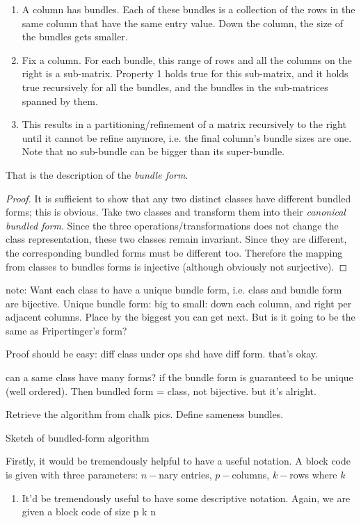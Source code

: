 \documentclass[12pt]{article}  %
\begin{document}
\begin{enumerate}
\item A column has bundles. Each of these bundles is a collection of the rows in the same column that have the same entry value. Down the column, the size of the bundles gets smaller.

\item Fix a column. For each bundle, this range of rows and all the columns on the right is a sub-matrix. Property 1 holds true for this sub-matrix, and it holds true recursively for all the bundles, and the bundles in the sub-matrices spanned by them. 

\item This results in a partitioning/refinement of a matrix recursively to the right until it cannot be refine anymore, i.e. the final column's bundle sizes are one. Note that no sub-bundle can be bigger than its super-bundle.

\end{enumerate}


That is the description of the \textit{bundle form}. 


\begin{proof}
It is sufficient to show that any two distinct classes have different bundled forms; this is obvious. Take two classes and transform them into their \textit{canonical bundled form}. Since the three operations/transformations does not change the class representation, these two classes remain invariant. Since they are different, the corresponding bundled forms must be different too. Therefore the mapping from classes to bundles forms is injective (although obviously not surjective).
\end{proof}

note: Want each class to have a unique bundle form, i.e. class and bundle form are bijective.
Unique bundle form: big to small: down each column, and right per adjacent columns. Place by the biggest you can get next. But is it going to be the same as Fripertinger's form?

Proof should be easy: diff class under ops shd have diff form. that's okay.

can a same class have many forms? if the bundle form is guaranteed to be unique (well ordered). Then bundled form = class, not bijective. but it's alright.

Retrieve the algorithm from chalk pics. Define sameness bundles.
\\

{\large \centerline{Sketch of bundled-form algorithm}}


Firstly, it would be tremendously helpful to have a useful notation. A block code is given with three parameters: $n-$nary entries, $p-$columns, $k-$rows where $k$

\begin{enumerate}
\item It'd be tremendously useful to have some descriptive notation. Again, we are given a block code of size p k n
\end{enumerate}
\end{document}
